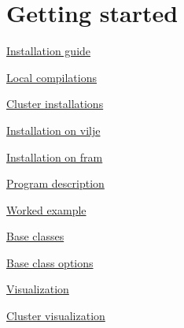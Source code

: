 \section*{Getting started}


\begin{DoxyItemize}
\item \hyperlink{md_installation_instructions}{Installation guide}
\begin{DoxyItemize}
\item \hyperlink{installation-local}{Local compilations}
\item \hyperlink{cluster-installations}{Cluster installations}
\begin{DoxyItemize}
\item \hyperlink{installation-vilje}{Installation on vilje}
\item \hyperlink{installation-fram}{Installation on fram}
\end{DoxyItemize}
\end{DoxyItemize}
\item \hyperlink{program-structure}{Program description}
\begin{DoxyItemize}
\item \hyperlink{worked-example}{Worked example}
\end{DoxyItemize}
\item \hyperlink{base-classes}{Base classes}
\begin{DoxyItemize}
\item \hyperlink{class-options}{Base class options}
\end{DoxyItemize}
\item \hyperlink{visualization-instructions}{Visualization}
\begin{DoxyItemize}
\item \hyperlink{visualization-cluster}{Cluster visualization} 
\end{DoxyItemize}
\end{DoxyItemize}